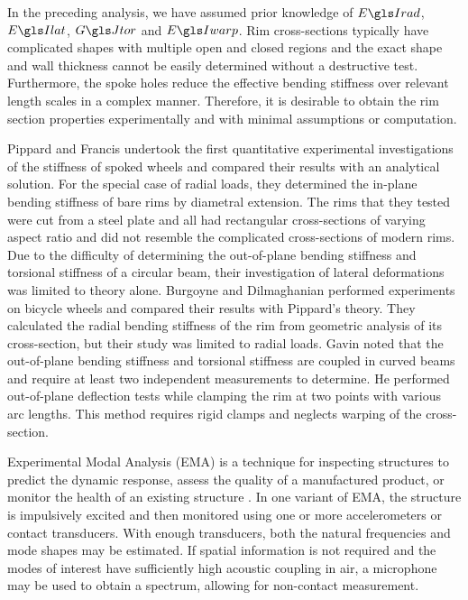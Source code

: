 \documentclass[../thesis.tex]{subfiles}
\begin{document}
In the preceding analysis, we have assumed prior knowledge of $\EIr$, $\EIl$, $\GJ$ and $\EIw$. Rim cross-sections typically have complicated shapes with multiple open and closed regions and the exact shape and wall thickness cannot be easily determined without a destructive test. Furthermore, the spoke holes reduce the effective bending stiffness over relevant length scales in a complex manner. Therefore, it is desirable to obtain the rim section properties experimentally and with minimal assumptions or computation.

Pippard and Francis \cite{Pippard1931} undertook the first quantitative experimental investigations of the stiffness of spoked wheels and compared their results with an analytical solution. For the special case of radial loads, they determined the in-plane bending stiffness of bare rims by diametral extension. The rims that they tested were cut from a steel plate and all had rectangular cross-sections of varying aspect ratio and did not resemble the complicated cross-sections of modern rims. Due to the difficulty of determining the out-of-plane bending stiffness and torsional stiffness of a circular beam, their investigation of lateral deformations was limited to theory alone. Burgoyne and Dilmaghanian \cite{Burgoyne1993} performed experiments on bicycle wheels and compared their results with Pippard's theory. They calculated the radial bending stiffness of the rim from geometric analysis of its cross-section, but their study was limited to radial loads. Gavin \cite{Gavin1996} noted that the out-of-plane bending stiffness and torsional stiffness are coupled in curved beams and require at least two independent measurements to determine. He performed out-of-plane deflection tests while clamping the rim at two points with various arc lengths. This method requires rigid clamps and neglects warping of the cross-section.

Experimental Modal Analysis (EMA) \cite{Ewins1984} is a technique for inspecting structures to predict the dynamic response, assess the quality of a manufactured product, or monitor the health of an existing structure \cite{Salawu1997}. In one variant of EMA, the structure is impulsively excited and then monitored using one or more accelerometers or contact transducers. With enough transducers, both the natural frequencies and mode shapes may be estimated. If spatial information is not required and the modes of interest have sufficiently high acoustic coupling in air, a microphone may be used to obtain a spectrum, allowing for non-contact measurement.
\end{document}
